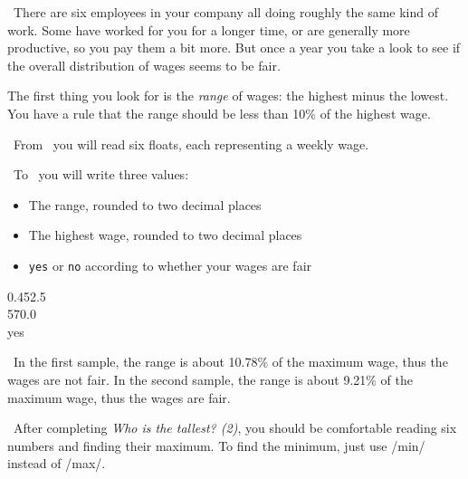 

\Question\ There are six employees in your company all doing roughly the same kind of
work. Some have worked for you for a longer time, or are generally more productive, so you
pay them a bit more. But once a year you take a look to see if the overall distribution of
wages seems to be fair.

The first thing you look for is the \emph{range} of wages: the highest minus the lowest.
You have a rule that the range should be less than 10\% of the highest wage.

\Input\ From \IN\ you will read six floats, each representing a weekly wage.

\Output\ To \OUT\ you will write three values:
\begin{itemize}
  \item The range, rounded to two decimal places
  \item The highest wage, rounded to two decimal places
  \item \texttt{yes} or \texttt{no} according to whether your wages are fair
\end{itemize}

\Sample

             {
                     {0.4}{52.5\\570.0\\yes}}

\Explanation\ In the first sample, the range is about 10.78\% of the maximum wage, thus
the wages are not fair. In the second sample, the range is about 9.21\% of the maximum
wage, thus the wages are fair.

\Scratch\ After completing \emph{Who is the tallest? (2)}, you should be comfortable
reading six numbers and finding their maximum. To find the minimum, just use \pycode/min/
instead of \pycode/max/.

